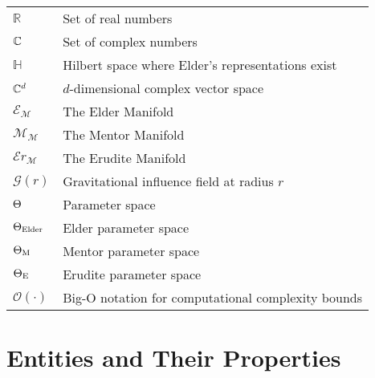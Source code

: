 \begin{tabular}{p{3cm} p{12cm}}
$\mathbb{R}$ & Set of real numbers \\
$\mathbb{C}$ & Set of complex numbers \\
$\mathbb{H}$ & Hilbert space where Elder's representations exist \\
$\mathbb{C}^{d}$ & $d$-dimensional complex vector space \\
$\mathcal{E}_{\mathcal{M}}$ & The Elder Manifold \\
$\mathcal{M}_{\mathcal{M}}$ & The Mentor Manifold \\
$\mathcal{E}r_{\mathcal{M}}$ & The Erudite Manifold \\
$\mathcal{G}(r)$ & Gravitational influence field at radius $r$ \\
$\Theta$ & Parameter space \\
$\Theta_{\text{Elder}}$ & Elder parameter space \\
$\Theta_{\text{M}}$ & Mentor parameter space \\
$\Theta_{\text{E}}$ & Erudite parameter space \\
$\mathcal{O}(\cdot)$ & Big-O notation for computational complexity bounds \\
\end{tabular}

\section*{Entities and Their Properties}

